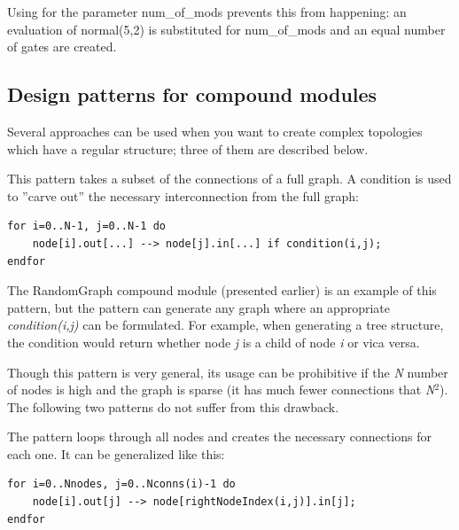 Using  for the parameter num\_of\_mods
prevents this from happening: an evaluation of normal(5,2) is
substituted for num\_of\_mods and an equal number of gates are
created.





\subsection{Design patterns for compound modules}


Several approaches can be used when you want to create complex 
topologies which have a regular structure; three of them are 
described below. 




This pattern takes a subset of the connections of a full graph.  A
condition is used to ''carve out'' the necessary interconnection from
the full graph:


\begin{Verbatim}[commandchars=\\\{\}]
for i=0..N-1, j=0..N-1 do 
    node[i].out[...] --> node[j].in[...] if condition(i,j);
endfor
\end{Verbatim}




The RandomGraph compound module (presented earlier) is an example of
this pattern, but the pattern can generate any graph where an
appropriate \textit{condition(i,j)} can be formulated. For example,
when generating a tree structure, the condition
would return whether node \textit{j} is a child of node \textit{i} or
vica versa.

Though this pattern is very general, its usage can be prohibitive if
the \textit{N} number of nodes is high and the graph is sparse (it has
much fewer connections that \textit{N}$^{\mathit{2}}$). The following
two patterns do not suffer from this drawback.




The pattern loops through all nodes and creates the necessary
connections for each one. It can be generalized like this:


\begin{Verbatim}[commandchars=\\\{\}]
for i=0..Nnodes, j=0..Nconns(i)-1 do 
    node[i].out[j] --> node[rightNodeIndex(i,j)].in[j];
endfor
\end{Verbatim}



